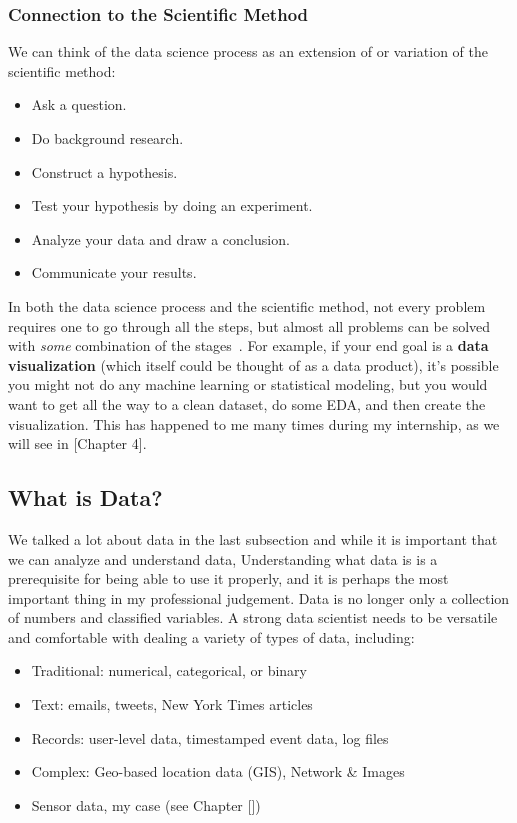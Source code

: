 \subsubsection{Connection to the Scientific Method}
We can think of the data science process as an extension of or variation of the scientific method:
\begin{itemize}
    \item Ask a question.
    \item Do background research.
    \item Construct a hypothesis.
    \item Test your hypothesis by doing an experiment.
    \item Analyze your data and draw a conclusion.
    \item Communicate your results.
\end{itemize}
In both the data science process and the scientific method, not every problem requires one to go through all the steps, but almost all problems can be solved with \textit{some} combination of the stages~\cite{Book:doing_data_science}.
For example, if your end goal is a \textbf{data visualization} (which itself could be thought of as a data product), it’s possible you might not do any machine learning or statistical modeling,
but you would want to get all the way to a clean dataset, do some \acl{EDA}, and then create the visualization. This has happened to me many times during my internship, as we will see in [Chapter 4].

\subsection{What is Data?}
We talked a lot about data in the last subsection and while it is important that we can analyze and understand data, 
Understanding what data is is a prerequisite for being able to use it properly, and it is perhaps the most important thing in my professional judgement.
Data is no longer only a collection of numbers and classified variables.
A strong data scientist needs to be versatile and comfortable with dealing a variety of types of data, including:
\begin{itemize}
    \item Traditional: numerical, categorical, or binary
    \item Text: emails, tweets, New York Times articles
    \item Records: user-level data, timestamped event data, log files
    \item Complex: Geo-based location data (GIS), Network \& Images
    \item Sensor data, my case (see Chapter [])
\end{itemize}


